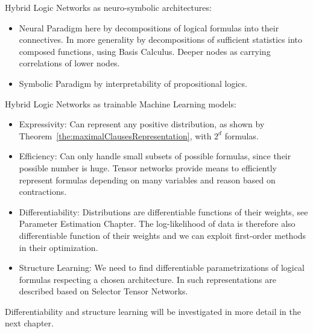 
Hybrid Logic Networks as neuro-symbolic architectures:
\begin{itemize}
	\item Neural Paradigm here by decompositions of logical formulas into their connectives.
		In more generality by decompositions of sufficient statistics into composed functions, using Basis Calculus.
		Deeper nodes as carrying correlations of lower nodes.
	\item Symbolic Paradigm by interpretability of propositional logics.
\end{itemize}


Hybrid Logic Networks as trainable Machine Learning models:
\begin{itemize}
	\item Expressivity: Can represent any positive distribution, as shown by Theorem~\ref{the:maximalClausesRepresentation}, with $2^d$ formulas.
	\item Efficiency: Can only handle small subsets of possible formulas, since their possible number is huge.
		Tensor networks provide means to efficiently represent formulas depending on many variables and reason based on contractions.
	\item Differentiability: Distributions are differentiable functions of their weights, see Parameter Estimation Chapter. 
		The log-likelihood of data is therefore also differentiable function of their weights and we can exploit first-order methods in their optimization.
	\item Structure Learning: We need to find differentiable parametrizations of logical formulas respecting a chosen architecture.
		In  such representations are described based on Selector Tensor Networks.
\end{itemize}
Differentiability and structure learning will be investigated in more detail in the next chapter.





